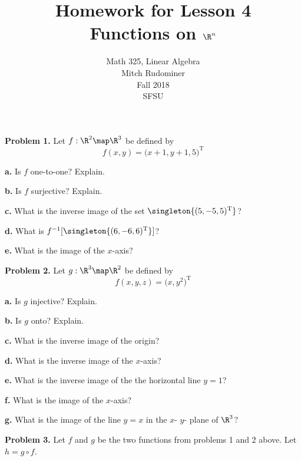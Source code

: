 \documentclass[oneside,12pt]{amsart}
\begin{document}
\title{Homework for Lesson 4 \\ Functions on $\R^n$}
\author{Math 325, Linear Algebra \\ Mitch Rudominer \\ Fall 2018 \\ SFSU }
\date{}

\maketitle


\textbf{Problem 1.} Let $f:\R^2\map\R^3$ be defined by
$$f(x,y) = \big(x+1, y+1,5 \big)^{\text{T}}$$

\textbf{a.} Is $f$ one-to-one? Explain.

\bigskip

\textbf{b.} Is $f$ surjective? Explain.

\bigskip

\textbf{c.} What is the inverse image of the set $\singleton{(5, -5, 5)^{\text{T}}}$?

\bigskip

\textbf{d.} What is $f^{-1}[\singleton{(6, -6, 6)^{\text{T}}}]$?

\bigskip

\textbf{e.} What is the image of the $x$-axis?

\bigskip

\textbf{Problem 2.} Let $g:\R^3\map\R^2$ be defined by
$$f(x,y,z) = \big(x, y^2 \big)^{\text{T}}$$

\textbf{a.} Is $g$ injective? Explain.

\bigskip

\textbf{b.} Is $g$ onto? Explain.

\bigskip

\textbf{c.} What is the inverse image of the origin?

\bigskip

\textbf{d.} What is the inverse image of the $x$-axis?

\bigskip

\textbf{e.} What is the inverse image of the the horizontal line $y=1$?

\bigskip

\textbf{f.} What is the image of the $x$-axis?

\bigskip

\textbf{g.} What is the image of the line $y=x$ in the $x$- $y$- plane
of $\R^3$?

\bigskip

\textbf{Problem 3.} Let $f$ and $g$ be the two functions from problems
1 and 2 above. Let $h = g \circ f$.
\end{document}
